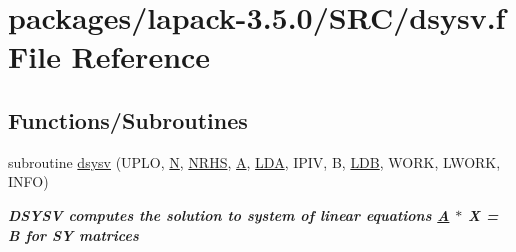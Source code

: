 \hypertarget{dsysv_8f}{}\section{packages/lapack-\/3.5.0/\+S\+R\+C/dsysv.f File Reference}
\label{dsysv_8f}
\subsection*{Functions/\+Subroutines}
\begin{DoxyCompactItemize}
\item 
subroutine \hyperlink{group__doubleSYsolve_ga9995c47692c9885ed5d6a6b431686f41}{dsysv} (U\+P\+L\+O, \hyperlink{polmisc_8c_a0240ac851181b84ac374872dc5434ee4}{N}, \hyperlink{example__user_8c_aa0138da002ce2a90360df2f521eb3198}{N\+R\+H\+S}, \hyperlink{classA}{A}, \hyperlink{example__user_8c_ae946da542ce0db94dced19b2ecefd1aa}{L\+D\+A}, I\+P\+I\+V, B, \hyperlink{example__user_8c_a50e90a7104df172b5a89a06c47fcca04}{L\+D\+B}, W\+O\+R\+K, L\+W\+O\+R\+K, I\+N\+F\+O)
\begin{DoxyCompactList}\small\item\em {\bfseries  D\+S\+Y\+S\+V computes the solution to system of linear equations \hyperlink{classA}{A} $\ast$ X = B for S\+Y matrices} \end{DoxyCompactList}\end{DoxyCompactItemize}
